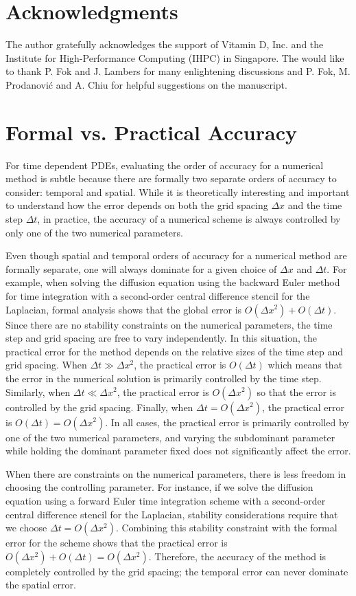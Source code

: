 \documentclass[fleqn,12pt,twoside]{article}
\def\dt{\Delta t}
\def\dx{\Delta x}
\begin{document}
\section*{Acknowledgments}
The author gratefully acknowledges the support of Vitamin D, Inc.
and the Institute for High-Performance Computing (IHPC) in Singapore. 
The would like to thank P. Fok and J. Lambers for many enlightening 
discussions and P. Fok, M. Prodanovi\'c and A. Chiu for helpful suggestions 
on the manuscript.  


\appendix
\section{Formal vs. Practical Accuracy
         \label{app:formal_vs_practical_accuracy} }
For time dependent PDEs, evaluating the order of accuracy for a numerical
method is subtle because there are formally two separate orders of accuracy 
to consider:  temporal and spatial.  While it is theoretically
interesting and important to understand how the error depends on both the 
grid spacing $\dx$ and the time step $\dt$, in practice, the accuracy 
of a numerical scheme is always controlled by only one of the two numerical
parameters.  

Even though spatial and temporal orders of accuracy for a numerical method
are formally separate, one will always dominate for a given choice of 
$\dx$ and $\dt$.  For example, when solving the diffusion equation 
using the backward Euler method for time integration with a second-order 
central difference stencil for the Laplacian, formal analysis shows that 
the global error is $O(\dx^2) + O(\dt)$.  Since there are no 
stability constraints on the numerical parameters, the time
step and grid spacing are free to vary independently.  In this situation, the 
practical error for the method depends on the relative sizes of the time step 
and grid spacing.  When $\dt \gg \dx^2$, the practical error is 
$O(\dt)$ which means that the error in the numerical solution is 
primarily controlled by the time step.  Similarly, when 
$\dt \ll \dx^2$, the practical error is $O(\dx^2)$ so that 
the error is controlled by the grid spacing.  Finally, when 
$\dt  = O(\dx^2)$, the practical error is 
$O(\dt) = O(\dx^2)$.  In all cases, the practical error is 
primarily controlled by one of the two numerical parameters, and varying
the subdominant parameter while holding the dominant parameter fixed does 
not significantly affect the error.
 
When there are constraints on the numerical parameters, there is less freedom 
in choosing the controlling parameter.  For instance, if we solve the 
diffusion equation using a forward Euler time integration scheme with a 
second-order central difference stencil for the Laplacian, stability
considerations require that we choose $\dt = O(\dx^2)$.  
Combining this stability constraint with the formal error for the scheme
shows that the practical error is 
$O(\dx^2) + O(\dt) = O(\dx^2)$.  Therefore, the accuracy of the 
method is completely controlled by the grid spacing; the temporal error can 
never dominate the spatial error.
\end{document}
